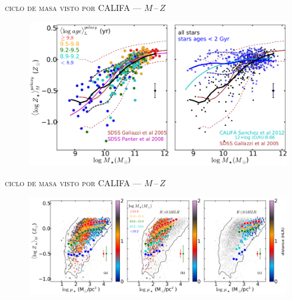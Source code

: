 \documentclass[xcolor=dvipsnames,4pt,hyperref={colorlinks,citecolor=black,linkcolor=black,urlcolor=black}]{beamer}
\begin{document}
\begin{frame}{\textsc{ciclo de masa visto por CALIFA --- $M\,$--$\,Z$}}

\begin{figure}
\includegraphics[scale=1]{img/gonzalez2014b-1}
\end{figure}
\end{frame}

\begin{frame}{\textsc{ciclo de masa visto por CALIFA --- $M\,$--$\,Z$}}

\begin{figure}
\includegraphics[scale=1]{img/gonzalez2014b-3}
\end{figure}
\end{frame}
\end{document}
